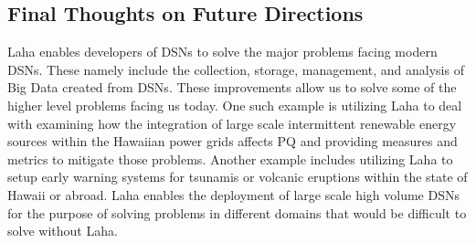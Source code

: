 \subsection{Final Thoughts on Future Directions}\label{subsec:final-thoughts-on-future-directions}
Laha enables developers of DSNs to solve the major problems facing modern DSNs. These namely include the collection, storage, management, and analysis of Big Data created from DSNs. These improvements allow us to solve some of the higher level problems facing us today. One such example is utilizing Laha to deal with examining how the integration of large scale intermittent renewable energy sources within the Hawaiian power grids affects PQ and providing measures and metrics to mitigate those problems. Another example includes utilizing Laha to setup early warning systems for tsunamis or volcanic eruptions within the state of Hawaii or abroad. Laha enables the deployment of large scale high volume DSNs for the purpose of solving problems in different domains that would be difficult to solve without Laha.
